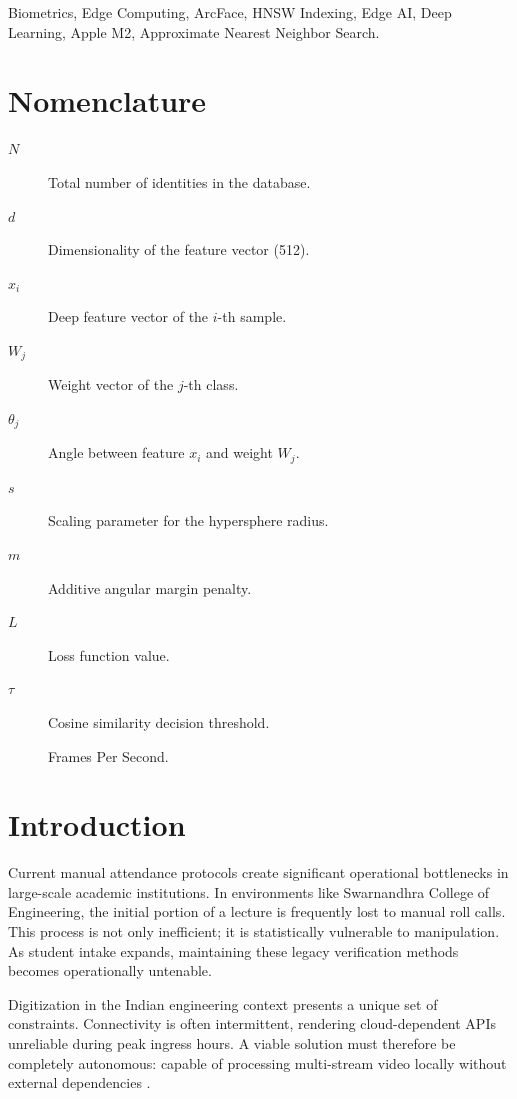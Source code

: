 \documentclass[conference]{IEEEtran}
\begin{document}
\begin{IEEEkeywords}
Biometrics, Edge Computing, ArcFace, HNSW Indexing, Edge AI, Deep Learning, Apple M2, Approximate Nearest Neighbor Search.
\end{IEEEkeywords}

\section*{Nomenclature}
\begin{description}
    \item[$N$] Total number of identities in the database.
    \item[$d$] Dimensionality of the feature vector (512).
    \item[$x_i$] Deep feature vector of the $i$-th sample.
    \item[$W_j$] Weight vector of the $j$-th class.
    \item[$\theta_j$] Angle between feature $x_i$ and weight $W_j$.
    \item[$s$] Scaling parameter for the hypersphere radius.
    \item[$m$] Additive angular margin penalty.
    \item[$L$] Loss function value.
    \item[$\tau$] Cosine similarity decision threshold.
    \item[] Frames Per Second.
\end{description}

\section{Introduction}
Current manual attendance protocols create significant operational bottlenecks in large-scale academic institutions. In environments like Swarnandhra College of Engineering, the initial portion of a lecture is frequently lost to manual roll calls. This process is not only inefficient; it is statistically vulnerable to manipulation. As student intake expands, maintaining these legacy verification methods becomes operationally untenable.

Digitization in the Indian engineering context presents a unique set of constraints. Connectivity is often intermittent, rendering cloud-dependent APIs unreliable during peak ingress hours. A viable solution must therefore be completely autonomous: capable of processing multi-stream video locally without external dependencies \cite{b1}.
\end{document}
